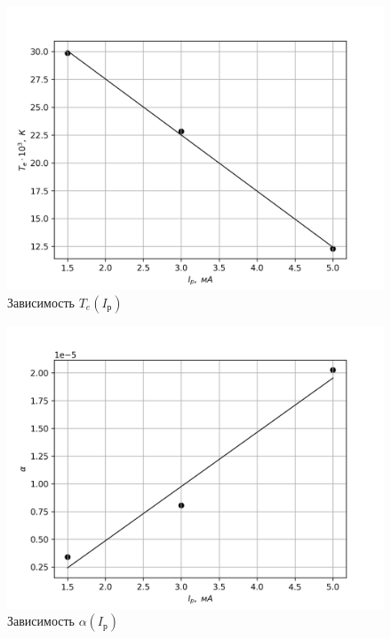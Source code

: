 \documentclass[14pt, a4paper]{report}
\begin{document}
\begin{figure}[h]
\centering
\includegraphics[scale=0.6]{images/351_3.png}
\caption{Зависимость $T_e(I_р)$}
\end{figure}

\begin{figure}[h]
\centering
\includegraphics[scale=0.6]{images/351_4.png}
\caption{Зависимость $\alpha(I_р)$}
\end{figure}
\end{document}
